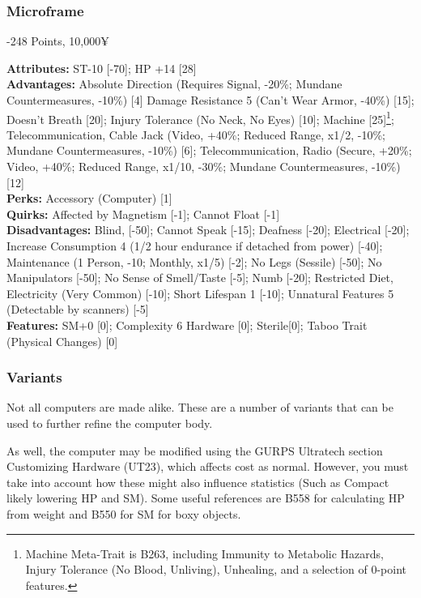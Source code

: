 \begin{multicols*}{3}
	\subsubsection*{Microframe}\label{ai_computer}
	\begin{flushright}
		-248 Points, 10,000¥
	\end{flushright}
	\textbf{Attributes:} 
	ST-10 [-70]; HP +14 [28]
	\\\textbf{Advantages:} 
	Absolute Direction (Requires Signal, -20\%; Mundane Countermeasures, -10\%) [4] Damage Resistance 5 (Can't Wear Armor, -40\%) [15]; Doesn't Breath [20]; Injury Tolerance (No Neck, No Eyes) [10]; Machine [25]\footnote{Machine Meta-Trait is B263, including Immunity to Metabolic Hazards, Injury Tolerance (No Blood, Unliving), Unhealing, and a selection of 0-point features.}; Telecommunication, Cable Jack (Video, +40\%; Reduced Range, x1/2, -10\%; Mundane Countermeasures, -10\%) [6]; Telecommunication, Radio (Secure, +20\%; Video, +40\%; Reduced Range, x1/10, -30\%; Mundane Countermeasures, -10\%) [12]
	\\\textbf{Perks:}
	Accessory (Computer) [1]
	\\\textbf{Quirks:}
	Affected by Magnetism [-1]; Cannot Float [-1]
	\\\textbf{Disadvantages:} 
	Blind, [-50]; Cannot Speak [-15]; Deafness [-20]; Electrical [-20]; Increase Consumption 4 (1/2 hour endurance if detached from power) [-40]; Maintenance (1 Person, -10; Monthly, x1/5) [-2]; No Legs (Sessile) [-50]; No Manipulators [-50]; No Sense of Smell/Taste [-5]; Numb [-20]; Restricted Diet, Electricity (Very Common) [-10]; Short Lifespan 1 [-10]; Unnatural Features 5 (Detectable by scanners) [-5]
	\\\textbf{Features:}
	SM+0 [0]; Complexity 6 Hardware [0]; Sterile[0]; Taboo Trait (Physical Changes) [0]
	
	\subsubsection*{Variants}
	
	Not all computers are made alike. These are a number of variants that can be used to further refine the computer body. 
	
	As well, the computer may be modified using the GURPS Ultratech section Customizing Hardware (UT23), which affects cost as normal. However, you must take into account how these might also influence statistics (Such as Compact likely lowering HP and SM). Some useful references are B558 for calculating HP from weight and B550 for SM for boxy objects.
	

\end{multicols*}
